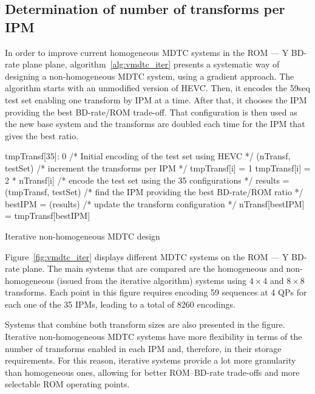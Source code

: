 \documentclass[11pt,a4paper,openright,twoside]{book}
\numberwithin{equation}{section} %
\numberwithin{figure}{section} %
\numberwithin{table}{section} %
\begin{document}
\subsection{Determination of number of transforms per \acs{IPM}}
\label{sub:rw_determination_number_transforms_ipm}

In order to improve current homogeneous \ac{MDTC} systems in the \acs{ROM} ---
Y \acs{BD}-rate plane plane, algorithm~\ref{alg:vmdtc_iter} presents a
systematic way of designing a non-homogeneous \ac{MDTC} system, using a
gradient approach.
The algorithm starts with an unmodified version of \ac{HEVC}.
Then, it encodes the 59seq test set enabling one transform by \ac{IPM} at a
time.
After that, it chooses the \ac{IPM} providing the best \acs{BD}-rate/\acs{ROM}
trade-off.
That configuration is then used as the new base system and the transforms are
doubled each time for the \ac{IPM} that gives the best ratio.

\begin{algorithm}
	\small
	\BlankLine%
	\BlankLine%
	tmpTransf[35]: 0
	\BlankLine%
	/* Initial encoding of the test set using HEVC */
	\BlankLine%
	\encode(nTransf, testSet)
	\BlankLine%
	{
		/* increment the transforms per IPM */
		\BlankLine%
		{
			{
				tmpTransf[i] = 1
			}
			{
				tmpTransf[i] = 2 * nTransf[i]
			}
		}
		\BlankLine%
		/* encode the test set using the 35 configurations */
		\BlankLine%
		results = \encode(tmpTransf, testSet)
		\BlankLine%
		/* find the IPM providing the best BD-rate/ROM ratio */
		\BlankLine%
		bestIPM = \computeBestRatio(results)
		\BlankLine%
		/* update the transform configuration */
		\BlankLine%
		nTransf[bestIPM] = tmpTransf[bestIPM]
	}
	\caption{Iterative non-homogeneous \acs{MDTC} design}
	\label{alg:vmdtc_iter}
\end{algorithm}

Figure~\ref{fig:vmdtc_iter} displays different \ac{MDTC} systems on the
\acs{ROM} --- Y \ac{BD}-rate plane.
The main systems that are compared are the homogeneous and non-homogeneous
(issued from the iterative algorithm) systems using $4\times4$ and $8\times8$
transforms.
Each point in this figure requires encoding 59 sequences at 4 \acp{QP} for
each one of the 35 \acp{IPM}, leading to a total of \num{8260} encodings.

Systems that combine both transform sizes are also presented in the figure.
Iterative non-homogeneous \ac{MDTC} systems have more flexibility in terms of
the number of transforms enabled in each \ac{IPM} and, therefore, in their
storage requirements.
For this reason, iterative systems provide a lot more granularity than
homogeneous ones, allowing for better \acs{ROM}--\ac{BD}-rate trade-offs
and more selectable \acs{ROM} operating points.
\end{document}
